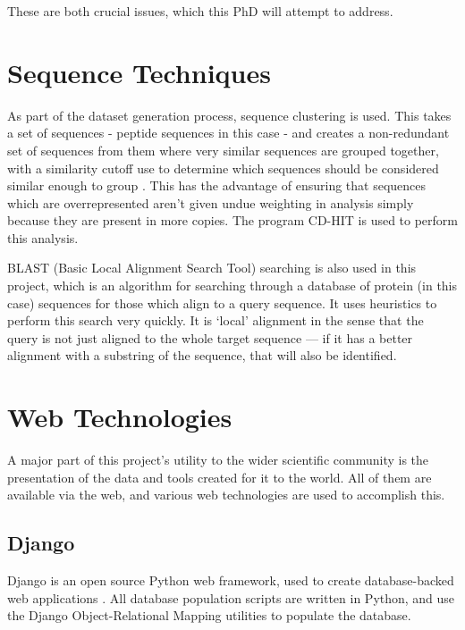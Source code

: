 These are both crucial issues, which this PhD will attempt to address.

\section{Sequence Techniques}

As part of the dataset generation process, sequence clustering is used. This takes a set of sequences - peptide sequences in this case - and creates a non-redundant set of sequences from them where very similar sequences are grouped together, with a similarity cutoff use to determine which sequences should be considered similar enough to group . This has the advantage of ensuring that sequences which are overrepresented aren't given undue weighting in analysis simply because they are present in more copies. The program CD-HIT is used to perform this analysis. 

BLAST (Basic Local Alignment Search Tool) searching is also used in this project, which is an algorithm for searching through a database of protein (in this case) sequences for those which align to a query sequence. It uses heuristics to perform this search very quickly. It is `local' alignment in the sense that the query is not just aligned to the whole target sequence --- if it has a better alignment with a substring of the sequence, that will also be identified. 

\section{Web Technologies}

A major part of this project's utility to the wider scientific community is the presentation of the data and tools created for it to the world. All of them are available via the web, and various web technologies are used to accomplish this.


\subsection{Django}

Django is an open source Python web framework, used to create database-backed web applications \cite{django}. All database population scripts are written in Python, and use the Django Object-Relational Mapping utilities to populate the database.

